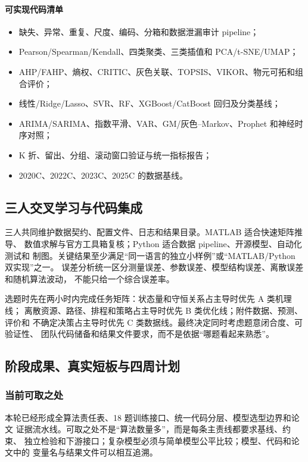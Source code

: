 \documentclass[UTF8,a4paper,12pt]{ctexart}
\begin{document}
\paragraph{可实现代码清单}
\begin{itemize}
  \item 缺失、异常、重复、尺度、编码、分箱和数据泄漏审计 pipeline；
  \item Pearson/Spearman/Kendall、四类聚类、三类插值和 PCA/t-SNE/UMAP；
  \item AHP/FAHP、熵权、CRITIC、灰色关联、TOPSIS、VIKOR、物元可拓和组合评价；
  \item 线性/Ridge/Lasso、SVR、RF、XGBoost/CatBoost 回归及分类基线；
  \item ARIMA/SARIMA、指数平滑、VAR、GM/灰色--Markov、Prophet 和神经时序对照；
  \item K 折、留出、分组、滚动窗口验证与统一指标报告；
  \item 2020C、2022C、2023C、2025C 的数据基线。
\end{itemize}

\subsection{三人交叉学习与代码集成}

三人共同维护数据契约、配置文件、日志和结果目录。MATLAB 适合快速矩阵推导、
数值求解与官方工具箱复核；Python 适合数据 pipeline、开源模型、自动化测试和
制图。关键结果至少满足“同一语言的独立小样例”或“MATLAB/Python 双实现”之一。
误差分析统一区分测量误差、参数误差、模型结构误差、离散误差和随机算法波动，
不能只给一个综合误差率。

选题时先在两小时内完成任务矩阵：状态量和守恒关系占主导时优先 A 类机理线；
离散资源、路径、排程和策略占主导时优先 B 类优化线；附件数据、预测、评价和
不确定决策占主导时优先 C 类数据线。最终决定同时考虑题意闭合度、可验证性、
团队代码储备和结果文件要求，而不是依据“哪题看起来熟悉”。

\subsection{阶段成果、真实短板与四周计划}

\subsubsection{当前可取之处}

本轮已经形成全算法责任表、18 题训练接口、统一代码分层、模型选型边界和论文
证据流水线。可取之处不是“算法数量多”，而是每条主责线都要求基线、约束、
独立检验和下游接口；复杂模型必须与简单模型公平比较；模型、代码和论文中的
变量名与结果文件可以相互追溯。
\end{document}
